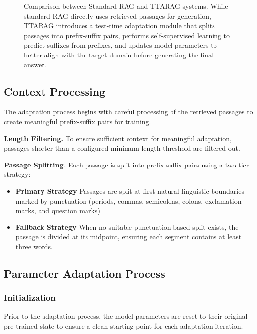 \documentclass{article}
\begin{document}
\begin{figure}[t]
\begin{tikzpicture}
\end{tikzpicture}

\caption{Comparison between Standard RAG and TTARAG systems. While standard RAG directly uses retrieved passages for generation, TTARAG introduces a test-time adaptation module that splits passages into prefix-suffix pairs, performs self-supervised learning to predict suffixes from prefixes, and updates model parameters to better align with the target domain before generating the final answer.}
\label{fig:rag_comparison}
\end{figure} \fi

\subsection{Context Processing}
The adaptation process begins with careful processing of the retrieved passages to create meaningful prefix-suffix pairs for training. 

\noindent\textbf{Length Filtering.} To ensure sufficient context for meaningful adaptation, passages shorter than a configured minimum length threshold are filtered out.

\noindent\textbf{Passage Splitting.} Each passage is split into prefix-suffix pairs using a two-tier strategy:
    \begin{itemize}
        \item \textbf{Primary Strategy} Passages are split at first natural linguistic boundaries marked by punctuation (periods, commas, semicolons, colons, exclamation marks, and question marks)
        \item \textbf{Fallback Strategy} When no suitable punctuation-based split exists, the passage is divided at its midpoint, ensuring each segment contains at least three words.
    \end{itemize}

\subsection{Parameter Adaptation Process}

\subsubsection{Initialization}
Prior to the adaptation process, the model parameters are reset to their original pre-trained state to ensure a clean starting point for each adaptation iteration. 

\end{document}
